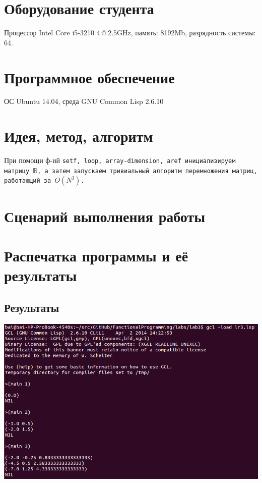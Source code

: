 \documentclass[12pt]{article}
\begin{document}
\section{Оборудование студента}
Процессор Intel Core i5-3210 4\,@\,2.5GHz, память: 8192Mb, разрядность системы: 64.

\section{Программное обеспечение}
ОС Ubuntu 14.04, среда GNU Common Lisp 2.6.10

\section{Идея, метод, алгоритм}
При помощи ф-ий \tt{setf, loop, array-dimension, aref} инициализируем матрицу $\mathbb{B}$, а затем запускаем тривиальный алгоритм перемножения матриц, работающий за $O(N^3)$.

\section{Сценарий выполнения работы}
\section{Распечатка программы и её результаты}

\subsection{Результаты}
\includegraphics[scale=0.5]{lr3Screen}

%
\end{document}
